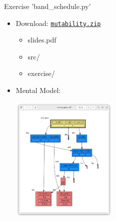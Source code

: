 \documentclass[10pt, colorlinks=true, urlcolor=blue]{beamer}
\begin{document}

\begin{frame}{Exercise 'band\_schedule.py'}
  \begin{itemize}
  \item Download: \href{https://raw.githubusercontent.com/bterwijn/memory_graph_videos/refs/heads/main/mutability/mutability.zip}{\texttt{mutability.zip}}
    \begin{itemize}
    \item slides.pdf
    \item src/
    \item exercise/
    \end{itemize}
  \item Mental Model: \begin{center}\includegraphics[width=0.4\textwidth]{figures/band_schedule.png}\end{center}
  \end{itemize}
\end{frame}
\end{document}
